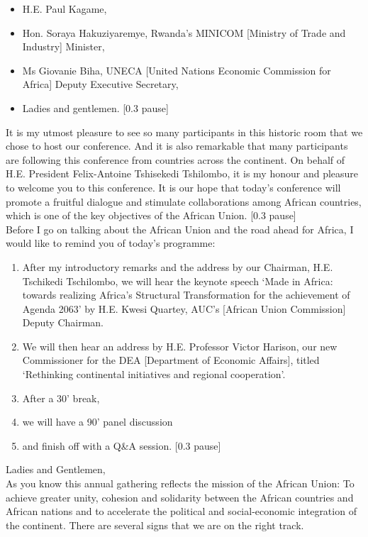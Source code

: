 \begin{itemize}
    \item H.E. Paul Kagame, 
    \item Hon. Soraya Hakuziyaremye, Rwanda’s MINICOM [Ministry of Trade and Industry] Minister, 
    \item Ms Giovanie Biha, UNECA [United Nations Economic Commission for Africa] Deputy Executive Secretary, 
    \item Ladies and gentlemen. [0.3 pause] 
\end{itemize}

\noindent It is my utmost pleasure to see so many participants in this historic room that we chose to host our conference. And it is also remarkable that many participants are following this conference from countries across the continent. On behalf of H.E. President Felix-Antoine Tshisekedi Tshilombo, it is my honour and pleasure to welcome you to this conference. It is our hope that today’s conference will promote a fruitful dialogue and stimulate collaborations among African countries, which is one of the key objectives of the African Union. [0.3 pause] \\

\noindent Before I go on talking about the African Union and the road ahead for Africa, I would like to remind you of today’s programme: 
\begin{enumerate}
    \item After my introductory remarks and the address by our Chairman, H.E. Tschikedi Tschilombo, we will hear the keynote speech ‘Made in Africa: towards realizing Africa’s Structural Transformation for the achievement of Agenda 2063’ by H.E. Kwesi Quartey, AUC’s [African Union Commission] Deputy Chairman. 
    \item We will then hear an address by H.E. Professor Victor Harison, our new Commissioner for the DEA [Department of Economic Affairs], titled ‘Rethinking continental initiatives and regional cooperation’. 
    \item After a 30’ break, 
    \item we will have a 90’ panel discussion 
    \item and finish off with a Q\&A session. [0.3 pause]
\end{enumerate}

\noindent Ladies and Gentlemen, \\\largerpage
As you know this annual gathering reflects the mission of the African Union: To achieve greater unity, cohesion and solidarity between the African countries and African nations and to accelerate the political and social-economic integration of the continent. There are several signs that we are on the right track. \\

